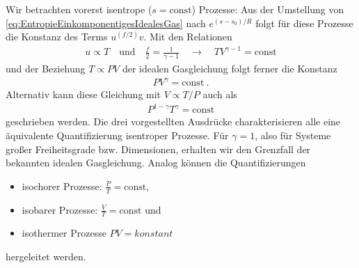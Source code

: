 Wir betrachten vorerst isentrope ($s=\mathrm{const}$) Prozesse:
Aus der Umstellung von \eqref{eq:EntropieEinkomponentigesIdealesGas} nach $e^{(s-s_0)/R}$ folgt für diese Prozesse die Konstanz des Terms $u^{(f/2)}v$.  Mit den Relationen
\begin{align*}
    u \propto T \quad\text{und}\quad \frac{f}{2}=\frac{1}{\gamma -1}\quad\rightarrow\quad TV^{\gamma-1}=\mathrm{const}
\end{align*}
und der Beziehung $T\propto PV$ der idealen Gasgleichung folgt ferner die Konstanz
\begin{align*}
    \boxed{PV^{\gamma}=\mathrm{const}}\:.
\end{align*}
Alternativ kann diese Gleichung mit $V\propto T/P$ auch als
\begin{align*}
    P^{1-\gamma}T^\gamma=\mathrm{const}
\end{align*}
geschrieben werden.
Die drei vorgestellten Ausdrücke charakterisieren alle eine äquivalente Quantifizierung isentroper Prozesse.
Für $\gamma = 1$, also für Systeme großer Freiheitsgrade bzw. Dimensionen, erhalten wir den Grenzfall der bekannten idealen Gasgleichung.
Analog können die Quantifizierungen
\begin{itemize}
    \item isochorer Prozesse: $\frac{P}{T}=\mathrm{const}$,
    \item isobarer Prozesse: $\frac{V}{T}=\mathrm{const}$ und
    \item isothermer Prozesse $PV=konstant$
\end{itemize}
hergeleitet werden.

